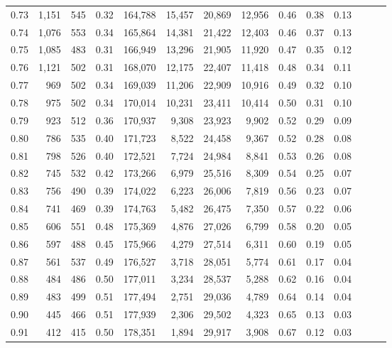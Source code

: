 \begin{tabular}{rrrrrrrrrrrrrr}
0.73 &  1,151 &  545 &  0.32 &  164,788 &   15,457 &  20,869 &  12,956 &  0.46 &  0.38 &      0.13 \\
0.74 &  1,076 &  553 &  0.34 &  165,864 &   14,381 &  21,422 &  12,403 &  0.46 &  0.37 &      0.13 \\
0.75 &  1,085 &  483 &  0.31 &  166,949 &   13,296 &  21,905 &  11,920 &  0.47 &  0.35 &      0.12 \\
0.76 &  1,121 &  502 &  0.31 &  168,070 &   12,175 &  22,407 &  11,418 &  0.48 &  0.34 &      0.11 \\
0.77 &    969 &  502 &  0.34 &  169,039 &   11,206 &  22,909 &  10,916 &  0.49 &  0.32 &      0.10 \\
0.78 &    975 &  502 &  0.34 &  170,014 &   10,231 &  23,411 &  10,414 &  0.50 &  0.31 &      0.10 \\
0.79 &    923 &  512 &  0.36 &  170,937 &    9,308 &  23,923 &   9,902 &  0.52 &  0.29 &      0.09 \\
0.80 &    786 &  535 &  0.40 &  171,723 &    8,522 &  24,458 &   9,367 &  0.52 &  0.28 &      0.08 \\
0.81 &    798 &  526 &  0.40 &  172,521 &    7,724 &  24,984 &   8,841 &  0.53 &  0.26 &      0.08 \\
0.82 &    745 &  532 &  0.42 &  173,266 &    6,979 &  25,516 &   8,309 &  0.54 &  0.25 &      0.07 \\
0.83 &    756 &  490 &  0.39 &  174,022 &    6,223 &  26,006 &   7,819 &  0.56 &  0.23 &      0.07 \\
0.84 &    741 &  469 &  0.39 &  174,763 &    5,482 &  26,475 &   7,350 &  0.57 &  0.22 &      0.06 \\
0.85 &    606 &  551 &  0.48 &  175,369 &    4,876 &  27,026 &   6,799 &  0.58 &  0.20 &      0.05 \\
0.86 &    597 &  488 &  0.45 &  175,966 &    4,279 &  27,514 &   6,311 &  0.60 &  0.19 &      0.05 \\
0.87 &    561 &  537 &  0.49 &  176,527 &    3,718 &  28,051 &   5,774 &  0.61 &  0.17 &      0.04 \\
0.88 &    484 &  486 &  0.50 &  177,011 &    3,234 &  28,537 &   5,288 &  0.62 &  0.16 &      0.04 \\
0.89 &    483 &  499 &  0.51 &  177,494 &    2,751 &  29,036 &   4,789 &  0.64 &  0.14 &      0.04 \\
0.90 &    445 &  466 &  0.51 &  177,939 &    2,306 &  29,502 &   4,323 &  0.65 &  0.13 &      0.03 \\
0.91 &    412 &  415 &  0.50 &  178,351 &    1,894 &  29,917 &   3,908 &  0.67 &  0.12 &      0.03 \\

\end{tabular}
